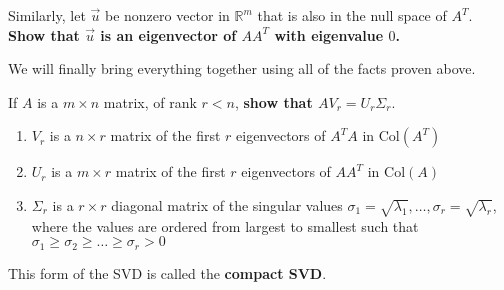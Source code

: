 \begin{enumerate}[resume]
\begin{enumerate}

  \ws{\vspace{75px}}


  \qitem Similarly, let $\vec{u}$ be nonzero vector in $\mathbb{R}^{m}$ that is also in the null space of $A^{T}.$
  \textbf{Show that $\vec{u}$ is an eigenvector of $AA^{T}$ with eigenvalue $0$.}

  \ws{\vspace{75px}}

  \end{enumerate}

  \newpage
  \qitem We will finally bring everything together using all of the facts proven above. 

  If $A$ is a $m \times n$ matrix, of rank $r < n$, \textbf{show that $AV_{r} = U_{r} \Sigma_{r}.$}

  \begin{enumerate}
  \item $V_{r}$ is a $n \times r$ matrix of the first $r$ eigenvectors of $A^{T}A$ in $\text{Col}(A^{T})$
  \item $U_{r}$ is a $m \times r$ matrix of the first $r$ eigenvectors of $AA^{T}$ in $\text{Col}(A)$ 
  \item $\Sigma_{r}$ is a $r \times r$ diagonal matrix of the singular values $
  \sigma_1 = \sqrt{\lambda_{1}}, \dotsc, \sigma_r = \sqrt{\lambda_{r}}$, where the values are ordered from largest to smallest such that $\sigma_1 \geq \sigma_2 \geq \ldots \geq \sigma_r > 0$
  \end{enumerate}
  This form of the SVD is called the \textbf{compact SVD}.


\end{enumerate}
